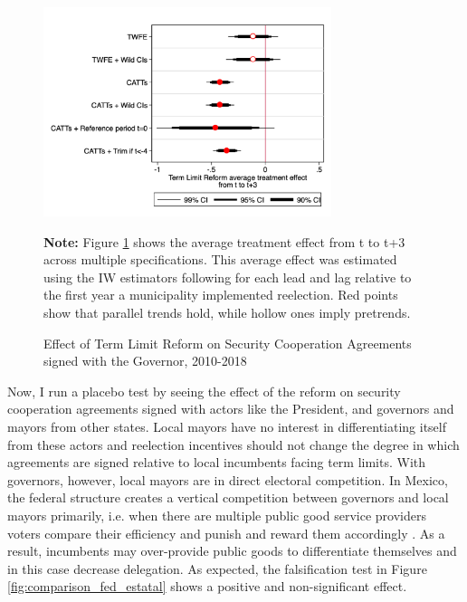 \documentclass[12pt]{amsart}
\numberwithin{equation}{section}
\theoremstyle{definition}
\theoremstyle{definition}
\theoremstyle{definition}
\begin{document}
  
\begin{figure}[h]   
\centering
 \caption{Effect of Term Limit Reform on Security Cooperation Agreements signed with the Governor, 2010-2018}
 \label{fig:robustness_agreements}
\includegraphics[width=0.75\textwidth]{../Figures/average_effects.png}
       \captionsetup{justification=centering}
       
 \textbf{Note:} Figure \ref{fig:robustness_agreements} shows the average treatment effect from t to t+3 across multiple specifications. This average effect was estimated using the IW estimators following \citet{abraham_sun_2020} for each lead and lag relative to the first year a municipality implemented reelection. Red points show that parallel trends hold, while hollow ones imply pretrends. 
\end{figure}   

Now, I run a placebo test by seeing the effect of the reform on security cooperation agreements signed with actors like the President, and governors and mayors from other states. Local mayors have no interest in differentiating itself from these actors and reelection incentives should not change the degree in which agreements are signed relative to local incumbents facing term limits. With governors, however, local mayors are in direct electoral competition. In Mexico, the federal structure creates a vertical competition between governors and local mayors primarily, i.e. when there are multiple public good service providers voters compare their efficiency and punish and reward them accordingly \citep{treisman_2000}. As a result, incumbents may over-provide public goods to differentiate themselves \citep{salmon_1987, Breton_1996, treisman_2000} and in this case decrease delegation. As expected,  the falsification test in Figure \ref{fig:comparison_fed_estatal} shows a positive and non-significant effect. 
    
\end{document}
